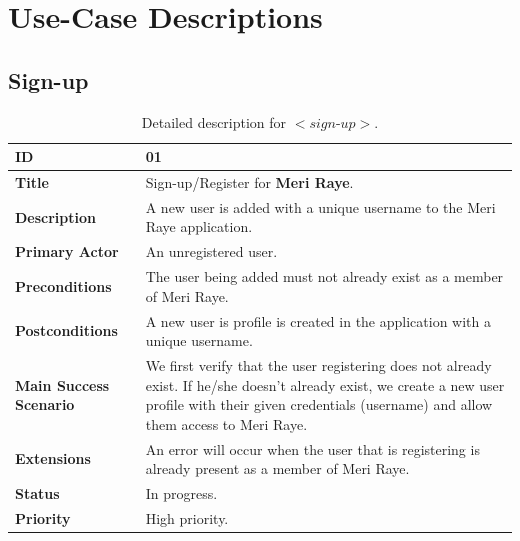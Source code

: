 \documentclass[11pt]{extarticle}
\begin{document}
\newpage
\justify
\section{Use-Case Descriptions}

\subsection{Sign-up}
\begin{table}[H]
    \begin{center}
        \begin{tabular}{ |m{6cm}|p{6cm}| } 
           \hline
           \textbf{ID} & 01\\
           \hline
           \textbf{Title} & Sign-up/Register for \textbf{Meri Raye}.\\
           \hline
           \textbf{Description} & A new user is added with a unique username to the Meri Raye application.\\
           \hline
           \textbf{Primary Actor} & An unregistered user.\\
           \hline
           \textbf{Preconditions} & The user being added must not already exist as a member of Meri Raye.\\
           \hline
           \textbf{Postconditions} & A new user is profile is created in the application with a unique username.\\
           \hline
           \textbf{Main Success Scenario} & We first verify that the user registering does not already exist. If he/she doesn't already exist, we create a new user profile with their given credentials (username) and allow them access to Meri Raye.\\
           \hline
           \textbf{Extensions} & An error will occur when the user that is registering is already present as a member of Meri Raye.\\
           \hline
           \textbf{Status} & In progress.\\
           \hline
           \textbf{Priority} & High priority.\\
           \hline
        \end{tabular}
    \end{center}
    \caption{\label{tab:Table 1} Detailed description for $<\textit{sign-up}>$.}
\end{table}

\newpage
\end{document}
